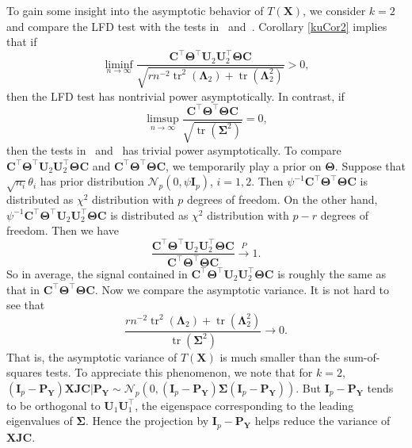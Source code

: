 \documentclass[12pt]{article} %
\DeclareMathOperator{\mytr}{tr}
\newcommand{\bX}{\mathbf{X}}
\newcommand{\bP}{\mathbf{P}}
\newcommand{\bY}{\mathbf{Y}}
\newcommand{\bJ}{\mathbf{J}}
\newcommand{\bC}{\mathbf{C}}
\newcommand{\bI}{\mathbf{I}}
\newcommand{\bU}{\mathbf{U}}
\newcommand{\bfsym}[1]{\ensuremath{\boldsymbol{#1}}}
\def\bLambda {\bfsym {\Lambda}}
\def\bSigma {\bfsym {\Sigma}}
\def\bTheta {\bfsym {\Theta}}
\theoremstyle{definition}
\begin{document}
To gain some insight into the asymptotic behavior of $T(\bX)$, we consider $k=2$ and compare the LFD test with the tests in~\cite{Bai1996Efiect} and~\cite{Chen2010A}.
Corollary \ref{kuCor2} implies that if
\begin{equation*}
    \liminf_{n\to \infty}\frac{
    \bC^\top \bTheta^\top \bU_2 \bU_2^\top \bTheta \bC
}{
    \sqrt{
        rn^{-2} \mytr^2 (\bLambda_2) + \mytr(\bLambda_2^2)
    }
}
>0,
\end{equation*}
then the LFD test has nontrivial power asymptotically.
In contrast, if
\begin{equation*}
    \limsup_{n\to \infty}\frac{
    \bC^\top \bTheta^\top \bTheta \bC
}{
    \sqrt{
        \mytr(\bSigma^2)
    }
}
=0,
\end{equation*}
then the tests in~\cite{Bai1996Efiect} and~\cite{Chen2010A} has trivial power asymptotically.
To compare 
$
    \bC^\top \bTheta^\top \bU_2 \bU_2^\top \bTheta \bC
$
and
$
    \bC^\top \bTheta^\top \bTheta \bC
$,
we temporarily play a prior on $\bTheta$.
Suppose that $\sqrt{n_i} \theta_i$ has prior distribution $\mathcal{N}_p(0,\psi \bI_p)$, $i=1,2$.
Then
$
\psi^{-1}\bC^\top \bTheta^\top \bTheta \bC$
is distributed as $\chi^2$ distribution with $p$ degrees of freedom.
On the other hand,
$\psi^{-1}\bC^\top \bTheta^\top \bU_2 \bU_2^\top \bTheta \bC$  is distributed as 
$\chi^2$ distribution with $p-r$ degrees of freedom.
Then we have
$$
\frac{\bC^\top \bTheta^\top \bU_2 \bU_2^\top \bTheta \bC}{\bC^\top \bTheta^\top \bTheta \bC}\xrightarrow{P}1.
$$
So in average, the signal contained in $\bC^\top \bTheta^\top \bU_2 \bU_2^\top \bTheta \bC$ is roughly the same as that in $\bC^\top \bTheta^\top \bTheta \bC$.
Now we compare the asymptotic variance.
It is not hard to see that
\begin{equation*}
    \frac{rn^{-2} \mytr^2 (\bLambda_2) + \mytr(\bLambda_2^2)}{
        \mytr(\bSigma^2)
    }\to 0.
\end{equation*}
That is, the asymptotic variance of $T(\bX)$ is much smaller than the sum-of-squares tests.
To appreciate this phenomenon,  we note that %
for $k=2$, 
$(\bI_p-\bP_\bY)\bX \bJ \bC|\bP_{\bY}\sim \mathcal{N}_p(0,(\bI_p-\bP_\bY)\bSigma(\bI_p-\bP_\bY))$.
But $\bI_p-\bP_\bY$ tends to be orthogonal to $\bU_1 \bU_1^\top$, the eigenspace corresponding to the leading eigenvalues of $\bSigma$.
Hence the projection by $\bI_p-\bP_\bY$ helps reduce the variance of $\bX \bJ \bC$.
\end{document}
